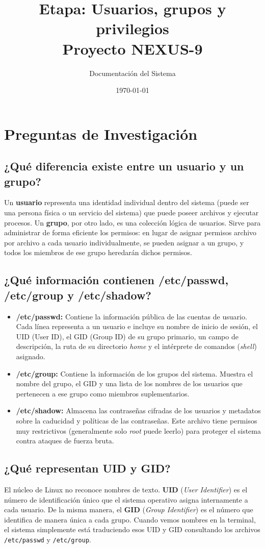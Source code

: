 \documentclass[12pt,a4paper]{article}
\title{\textbf{Etapa: Usuarios, grupos y privilegios \\ Proyecto NEXUS-9}}
\author{Documentación del Sistema}
\date{\today}
\begin{document}
\maketitle

\section*{Preguntas de Investigación}

\subsection*{¿Qué diferencia existe entre un usuario y un grupo?}
Un \textbf{usuario} representa una identidad individual dentro del sistema (puede ser una persona física o un servicio del sistema) que puede poseer archivos y ejecutar procesos. Un \textbf{grupo}, por otro lado, es una colección lógica de usuarios. Sirve para administrar de forma eficiente los permisos: en lugar de asignar permisos archivo por archivo a cada usuario individualmente, se pueden asignar a un grupo, y todos los miembros de ese grupo heredarán dichos permisos.

\subsection*{¿Qué información contienen /etc/passwd, /etc/group y /etc/shadow?}
\begin{itemize}
    \item \textbf{/etc/passwd:} Contiene la información pública de las cuentas de usuario. Cada línea representa a un usuario e incluye su nombre de inicio de sesión, el UID (User ID), el GID (Group ID) de su grupo primario, un campo de descripción, la ruta de su directorio \textit{home} y el intérprete de comandos (\textit{shell}) asignado.
    \item \textbf{/etc/group:} Contiene la información de los grupos del sistema. Muestra el nombre del grupo, el GID y una lista de los nombres de los usuarios que pertenecen a ese grupo como miembros suplementarios.
    \item \textbf{/etc/shadow:} Almacena las contraseñas cifradas de los usuarios y metadatos sobre la caducidad y políticas de las contraseñas. Este archivo tiene permisos muy restrictivos (generalmente solo \textit{root} puede leerlo) para proteger el sistema contra ataques de fuerza bruta.
\end{itemize}

\subsection*{¿Qué representan UID y GID?}
El núcleo de Linux no reconoce nombres de texto. \textbf{UID} (\textit{User Identifier}) es el número de identificación único que el sistema operativo asigna internamente a cada usuario. De la misma manera, el \textbf{GID} (\textit{Group Identifier}) es el número que identifica de manera única a cada grupo. Cuando vemos nombres en la terminal, el sistema simplemente está traduciendo esos UID y GID consultando los archivos \texttt{/etc/passwd} y \texttt{/etc/group}.
\end{document}
